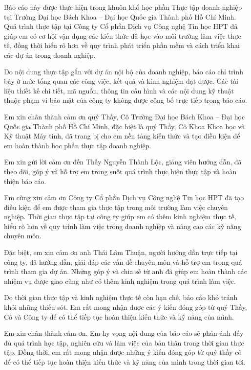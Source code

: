\documentclass[12pt,a4paper]{article}
\begin{document}
Báo cáo này được thực hiện trong khuôn khổ học phần Thực tập doanh nghiệp tại Trường Đại học Bách Khoa – Đại học Quốc gia Thành phố Hồ Chí Minh. Quá trình thực tập tại Công ty Cổ phần Dịch vụ Công nghệ Tin học HPT đã giúp em có cơ hội vận dụng các kiến thức đã học vào môi trường làm việc thực tế, đồng thời hiểu rõ hơn về quy trình phát triển phần mềm và cách triển khai các dự án trong doanh nghiệp.

Do nội dung thực tập gắn với dự án nội bộ của doanh nghiệp, báo cáo chỉ trình bày ở mức tổng quan các công việc, kết quả và kinh nghiệm đạt được. Các tài liệu thiết kế chi tiết, mã nguồn, thông tin cấu hình và các nội dung kỹ thuật thuộc phạm vi bảo mật của công ty không được công bố trực tiếp trong báo cáo.

Em xin chân thành cảm ơn quý Thầy, Cô Trường Đại học Bách Khoa – Đại học Quốc gia Thành phố Hồ Chí Minh, đặc biệt là quý Thầy, Cô Khoa Khoa học và Kỹ thuật Máy tính, đã trang bị cho em nền tảng kiến thức và tạo điều kiện để em hoàn thành học phần thực tập doanh nghiệp.

Em xin gửi lời cảm ơn đến Thầy Nguyễn Thành Lộc, giảng viên hướng dẫn, đã theo dõi, góp ý và hỗ trợ em trong suốt quá trình thực hiện thực tập và hoàn thiện báo cáo.

Em cũng xin cảm ơn Công ty Cổ phần Dịch vụ Công nghệ Tin học HPT đã tạo điều kiện để em được tham gia thực tập trong môi trường làm việc chuyên nghiệp. Thời gian thực tập tại công ty giúp em có thêm kinh nghiệm thực tế, hiểu rõ hơn về quy trình làm việc trong doanh nghiệp và nâng cao các kỹ năng chuyên môn.

Đặc biệt, em xin cảm ơn anh Thái Lâm Thuận, người hướng dẫn trực tiếp tại công ty, đã hướng dẫn, giải đáp các vấn đề chuyên môn và hỗ trợ em trong quá trình tham gia dự án. Những góp ý và chia sẻ từ anh đã giúp em hoàn thành các nhiệm vụ được giao cũng như có thêm kinh nghiệm trong quá trình làm việc.

Do thời gian thực tập và kinh nghiệm thực tế còn hạn chế, báo cáo khó tránh khỏi những thiếu sót. Em rất mong nhận được các ý kiến đóng góp từ quý Thầy, Cô và Công ty để có thể tiếp tục hoàn thiện kiến thức và kỹ năng của mình.

Em xin chân thành cảm ơn. Em hy vọng nội dung của báo cáo sẽ phản ánh đầy đủ quá trình học tập, nghiên cứu và làm việc của bản thân trong thời gian thực tập. Đồng thời, em rất mong nhận được những ý kiến đóng góp từ quý thầy cô để có thể tiếp tục hoàn thiện kiến thức và kỹ năng của mình trong thời gian tới.
\newpage











\end{document}
